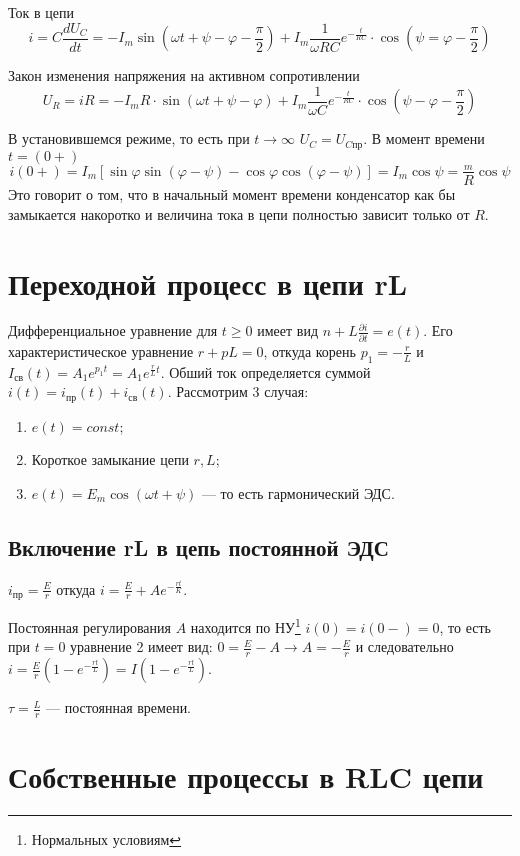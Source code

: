 Ток в цепи
\[ i = C \frac{dU_C}{dt} = -I_m \sin(\omega t + \psi - \varphi -
	\frac{\pi}{2}) + I_m \frac{1}{\omega RC}e^{-\frac{t}{RC}} \cdot
	\cos(\psi = \varphi - \frac{\pi}{2}) \]

Закон изменения напряжения на активном сопротивлении
\[ U_R = iR = -I_m R \cdot \sin(\omega t + \psi - \varphi) + I_m
	\frac{1}{\omega C} e^{-\frac{t}{RC}} \cdot \cos(\psi - \varphi -
	\frac{\pi}{2}) \]

В установившемся режиме, то есть при $t \to \infty$ $U_C =
	U_{Cпр}$. В момент времени $t = (0+)$
\[ i(0+) = I_m[\sin \varphi \sin(\varphi - \psi) - \cos \varphi
	\cos(\varphi - \psi)] = I_m \cos \psi = \frac{_m}{R} \cos \psi \]
Это говорит о том, что в начальный момент времени  конденсатор как
бы замыкается накоротко и величина тока в цепи полностью зависит
только от $R$.

\chapter{Переходной процесс в цепи rL}

Дифференциальное уравнение для $t\ge0$  имеет вид $n+L\frac{\partial
		i}{\partial t} = e(t)$. Его характеристическое уравнение $r+pL=0$,
откуда корень $p_1=-\frac{r}{L}$ и $I_{св}(t) = A_1 e^{p_1t} = A_1
	e^{\frac{r}{L}t}$. Обший ток определяется суммой $i(t) = i_{пр}(t) +i_{св}(t)$.
Рассмотрим 3 случая:
\begin{enumerate}
	\item  $e(t) = const$;
	\item  Короткое замыкание цепи $r, L$;
	\item  $e(t) = E_m \cos(\omega t + \psi)$ — то есть гармонический ЭДС.
\end{enumerate}

\section{Включение rL в цепь постоянной ЭДС}

$i_{пр} = \frac{E}{r}$ откуда $i=\frac{E}{r} + Ae^{-\frac{rt}{K}}$.

Постоянная регулирования $A$ находится по НУ\footnote{Нормальных
	условиям} $i(0) = i(0-) = 0$, то есть при $t = 0$ уравнение 2 имеет
вид: $0 = \frac{E}{r}-A \to A = -\frac{E}{r}$ и следовательно $i =
	\frac{E}{r} (1 - e^{-\frac{rt}{L}}) = I(1 - e^{-\frac{rt}{L}})$.

$\tau = \frac{L}{r}$ — постоянная времени.

\chapter{Собственные процессы в RLC цепи}

